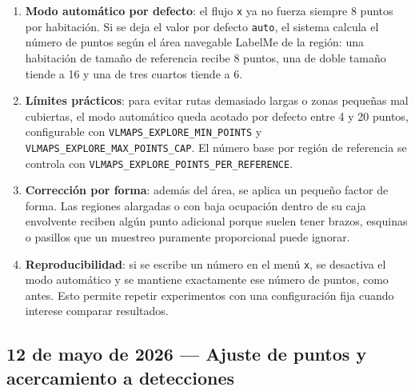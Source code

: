\documentclass[11pt,a4paper]{article}
\begin{document}
\begin{enumerate}
  \item \textbf{Modo automático por defecto}: el flujo \texttt{x} ya no fuerza
        siempre 8 puntos por habitación. Si se deja el valor por defecto
        \texttt{auto}, el sistema calcula el número de puntos según el área
        navegable LabelMe de la región: una habitación de tamaño de referencia
        recibe 8 puntos, una de doble tamaño tiende a 16 y una de tres cuartos
        tiende a 6.
  \item \textbf{Límites prácticos}: para evitar rutas demasiado largas o zonas
        pequeñas mal cubiertas, el modo automático queda acotado por defecto
        entre 4 y 20 puntos, configurable con
        \texttt{VLMAPS\_EXPLORE\_MIN\_POINTS} y
        \texttt{VLMAPS\_EXPLORE\_MAX\_POINTS\_CAP}. El número base por región
        de referencia se controla con
        \texttt{VLMAPS\_EXPLORE\_POINTS\_PER\_REFERENCE}.
  \item \textbf{Corrección por forma}: además del área, se aplica un pequeño
        factor de forma. Las regiones alargadas o con baja ocupación dentro de
        su caja envolvente reciben algún punto adicional porque suelen tener
        brazos, esquinas o pasillos que un muestreo puramente proporcional
        puede ignorar.
  \item \textbf{Reproducibilidad}: si se escribe un número en el menú
        \texttt{x}, se desactiva el modo automático y se mantiene exactamente
        ese número de puntos, como antes. Esto permite repetir experimentos con
        una configuración fija cuando interese comparar resultados.
\end{enumerate}

\subsection*{12 de mayo de 2026 --- Ajuste de puntos y acercamiento a detecciones}
\end{document}
